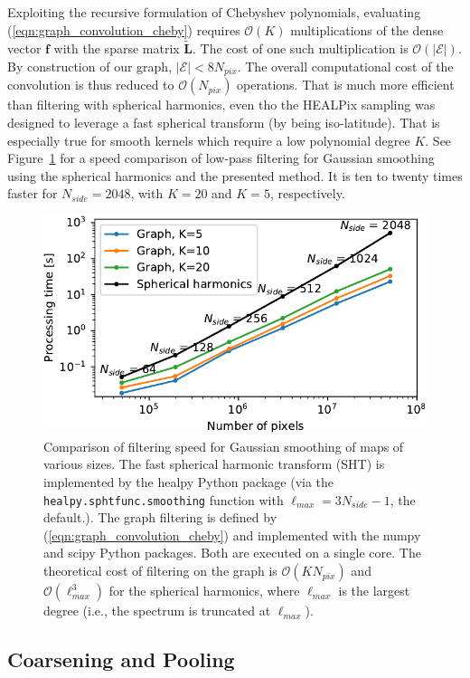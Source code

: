 \documentclass[final,twocolumn,3p,times,authoryear]{elsarticle}
\newcommand{\figref}[1]{Figure~\ref{fig:#1}}
\newcommand{\eqnref}[1]{(\ref{eqn:#1})}
\renewcommand{\b}[1]{{\bm{#1}}}   %
\newcommand{\1}{\b{1}}              %
\newcommand{\0}{\b{0}}              %
\newcommand{\E}{\mathcal{E}}
\renewcommand{\L}{\b{L}}
\newcommand{\tL}{\tilde{\L}}
\newcommand{\f}{\b{f}}
\newcommand{\bO}{\mathcal{O}}
\begin{document}
Exploiting the recursive formulation of Chebyshev polynomials, evaluating \eqnref{graph_convolution_cheby} requires $\bO(K)$ multiplications of the dense vector $\f$ with the sparse matrix $\tL$. The cost of one such multiplication is $\bO(|\E|)$. By construction of our graph, $|\E| < 8 N_{pix}$. The overall computational cost of the convolution is thus reduced to $\bO(N_{pix})$ operations.
That is much more efficient than filtering with spherical harmonics, even tho the HEALPix sampling was designed to leverage a fast spherical transform (by being iso-latitude). That is especially true for smooth kernels which require a low polynomial degree $K$. See \figref{filtering_speed} for a speed comparison of low-pass filtering for Gaussian smoothing using the spherical harmonics and the presented method. It is ten to twenty times faster for $N_{side} = 2048$, with $K=20$ and $K=5$, respectively.

\begin{figure}
	\centering
	\includegraphics[width=\linewidth]{filtering_speed}
	\caption{Comparison of filtering speed for Gaussian smoothing of maps of various sizes. The fast spherical harmonic transform (SHT) is implemented by the healpy Python package (via the \texttt{healpy.sphtfunc.smoothing} function with $\ell_{max} = 3 N_{side} - 1$, the default.). The graph filtering is defined by \eqnref{graph_convolution_cheby} and implemented with the numpy and scipy Python packages. Both are executed on a single core. The theoretical cost of filtering on the graph is $\bO(K N_{pix})$ and $\bO(\ell_{max}^3)$ for the spherical harmonics, where $\ell_{max}$ is the largest degree (i.e., the spectrum is truncated at $\ell_{max}$).}
	\label{fig:filtering_speed}
\end{figure}

\subsection{Coarsening and Pooling}
\end{document}
